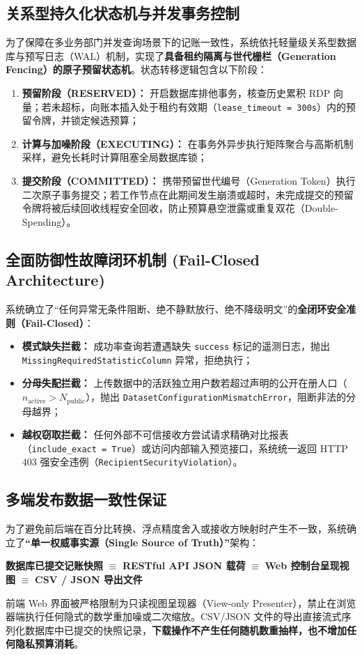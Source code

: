 \subsection{关系型持久化状态机与并发事务控制}
为了保障在多业务部门并发查询场景下的记账一致性，系统依托轻量级关系型数据库与预写日志（WAL）机制，实现了\textbf{具备租约隔离与世代栅栏（Generation Fencing）的原子预留状态机}。状态转移逻辑包含以下阶段：
\begin{enumerate}[label=(\alph*), leftmargin=2.5em]
  \item \textbf{预留阶段（RESERVED）：} 开启数据库排他事务，核查历史累积 RDP 向量；若未超标，向账本插入处于租约有效期（\texttt{lease\_timeout = 300s}）内的预留令牌，并锁定候选预算；
  \item \textbf{计算与加噪阶段（EXECUTING）：} 在事务外异步执行矩阵聚合与高斯机制采样，避免长耗时计算阻塞全局数据库锁；
  \item \textbf{提交阶段（COMMITTED）：} 携带预留世代编号（Generation Token）执行二次原子事务提交；若工作节点在此期间发生崩溃或超时，未完成提交的预留令牌将被后续回收线程安全回收，防止预算悬空泄露或重复双花（Double-Spending）。
\end{enumerate}

\subsection{全面防御性故障闭环机制 (Fail-Closed Architecture)}
系统确立了“任何异常无条件阻断、绝不静默放行、绝不降级明文”的\textbf{全闭环安全准则（Fail-Closed）}：
\begin{itemize}[leftmargin=2em]
  \item \textbf{模式缺失拦截：} 成功率查询若遭遇缺失 \texttt{success} 标记的遥测日志，抛出 \texttt{MissingRequired}\allowbreak\texttt{StatisticColumn} 异常，拒绝执行；
  \item \textbf{分母失配拦截：} 上传数据中的活跃独立用户数若超过声明的公开在册人口（$n_{\text{active}} > N_{\text{public}}$），抛出 \texttt{DatasetConfiguration}\allowbreak\texttt{MismatchError}，阻断非法的分母越界；
  \item \textbf{越权窃取拦截：} 任何外部不可信接收方尝试请求精确对比报表（\texttt{include\_exact = True}）或访问内部输入预览接口，系统统一返回 HTTP 403 强安全违例（\texttt{RecipientSecurity}\allowbreak\texttt{Violation}）。
\end{itemize}

\subsection{多端发布数据一致性保证}
为了避免前后端在百分比转换、浮点精度舍入或接收方映射时产生不一致，系统确立了\textbf{“单一权威事实源（Single Source of Truth）”}架构：
\begin{center}
  \textbf{数据库已提交记账快照} $\equiv$ \textbf{RESTful API JSON 载荷} $\equiv$ \textbf{Web 控制台呈现视图} $\equiv$ \textbf{CSV / JSON 导出文件}
\end{center}
前端 Web 界面被严格限制为只读视图呈现器（View-only Presenter），禁止在浏览器端执行任何隐式的数学重加噪或二次缩放。CSV/JSON 文件的导出直接流式序列化数据库中已提交的快照记录，\textbf{下载操作不产生任何随机数重抽样，也不增加任何隐私预算消耗}。
